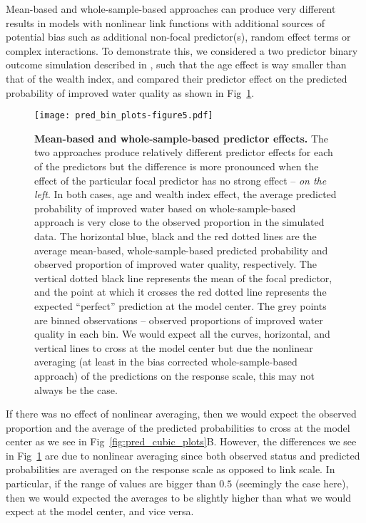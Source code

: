 \documentclass[10pt,letterpaper]{article}
\begin{document}
Mean-based and whole-sample-based approaches can produce very different results in models with nonlinear link functions with additional sources of potential bias such as additional non-focal predictor(s), random effect terms or complex interactions. To demonstrate this, we considered a two predictor binary outcome simulation described in , such that the age effect is way smaller than that of the wealth index, and compared their predictor effect on the predicted probability of improved water quality as shown in Fig~\ref{fig:pred_bin_plots}. 

\begin{figure}[!h]
\centering
\texttt{[image: pred\_bin\_plots-figure5.pdf]}
\caption{{\bf Mean-based and whole-sample-based predictor effects.} The two approaches produce relatively different predictor effects for each of the predictors but the difference is more pronounced when the effect of the particular focal predictor has no strong effect -- \emph{on the left}. In both cases, age and wealth index effect, the average predicted probability of improved water based on whole-sample-based approach is very close to the observed proportion in the simulated data. The horizontal blue, black and the red dotted lines are the average mean-based, whole-sample-based predicted probability and observed proportion of improved water quality, respectively. The vertical dotted black line represents the mean of the focal predictor, and the point at which it crosses the red dotted line represents the expected ``perfect'' prediction at the model center. The grey points are binned observations -- observed proportions of improved water quality in each bin. We would expect all the curves, horizontal, and vertical lines to cross at the model center but due the nonlinear averaging (at least in the bias corrected whole-sample-based approach) of the predictions on the response scale, this may not always be the case.} 
\label{fig:pred_bin_plots}
\end{figure}

If there was no effect of nonlinear averaging, then we would expect the observed proportion and the average of the predicted probabilities to cross at the model center as we see in Fig~\ref{fig:pred_cubic_plots}B. However, the differences we see in Fig~\ref{fig:pred_bin_plots} are due to nonlinear averaging since both observed status and predicted probabilities are averaged on the response scale as opposed to link scale. In particular, if the range of values are bigger than $0.5$ (seemingly the case here), then we would expected the averages to be slightly higher than what we would expect at the model center, and vice versa.
\end{document}
